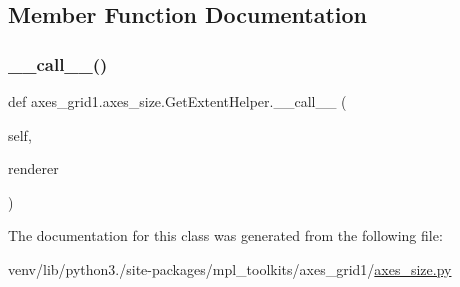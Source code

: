 \subsection{Member Function Documentation}
\mbox{\label{classaxes__grid1_1_1axes__size_1_1GetExtentHelper_ac0276776a6cb8c884bce61c9713606e4}} 
\subsubsection{\texorpdfstring{\+\_\+\+\_\+call\+\_\+\+\_\+()}{\_\_call\_\_()}}
{\footnotesize\ttfamily def axes\+\_\+grid1.\+axes\+\_\+size.\+Get\+Extent\+Helper.\+\_\+\+\_\+call\+\_\+\+\_\+ (\begin{DoxyParamCaption}\item[{}]{self,  }\item[{}]{renderer }\end{DoxyParamCaption})}



The documentation for this class was generated from the following file\+:\begin{DoxyCompactItemize}
\item 
venv/lib/python3./site-\/packages/mpl\+\_\+toolkits/axes\+\_\+grid1/\hyperlink{_2axes__size_8py}{axes\+\_\+size.\+py}\end{DoxyCompactItemize}

